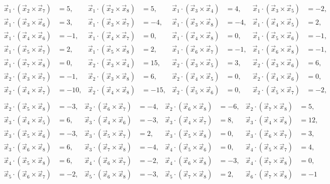 \documentclass[11pt]{exam}
\begin{document}
\begin{questions}
\begin{solution}
\begin{align*}
		\vec{x}_1\cdot(\vec{x}_2\times\vec{x}_7)&=5,&
		\vec{x}_1\cdot(\vec{x}_2\times\vec{x}_8)&=5,&
		\vec{x}_1\cdot(\vec{x}_3\times\vec{x}_4)&=4,&
		\vec{x}_1\cdot(\vec{x}_3\times\vec{x}_5)&=-2,\\
		\vec{x}_1\cdot(\vec{x}_3\times\vec{x}_6)&=3,&
		\vec{x}_1\cdot(\vec{x}_3\times\vec{x}_7)&=-4,&
		\vec{x}_1\cdot(\vec{x}_3\times\vec{x}_8)&=-4,&
		\vec{x}_1\cdot(\vec{x}_4\times\vec{x}_5)&=2,\\
		\vec{x}_1\cdot(\vec{x}_4\times\vec{x}_6)&=-1,&
		\vec{x}_1\cdot(\vec{x}_4\times\vec{x}_7)&=0,&
		\vec{x}_1\cdot(\vec{x}_4\times\vec{x}_8)&=0,&
		\vec{x}_1\cdot(\vec{x}_5\times\vec{x}_6)&=-1,\\
		\vec{x}_1\cdot(\vec{x}_5\times\vec{x}_7)&=2,&
		\vec{x}_1\cdot(\vec{x}_5\times\vec{x}_8)&=2,&
		\vec{x}_1\cdot(\vec{x}_6\times\vec{x}_7)&=-1,&
		\vec{x}_1\cdot(\vec{x}_6\times\vec{x}_8)&=-1,\\
		\vec{x}_1\cdot(\vec{x}_7\times\vec{x}_8)&=0,&
		\vec{x}_2\cdot(\vec{x}_3\times\vec{x}_4)&=15,&
		\vec{x}_2\cdot(\vec{x}_3\times\vec{x}_5)&=3,&
		\vec{x}_2\cdot(\vec{x}_3\times\vec{x}_6)&=6,\\
		\vec{x}_2\cdot(\vec{x}_3\times\vec{x}_7)&=-1,&
		\vec{x}_2\cdot(\vec{x}_3\times\vec{x}_8)&=6,&
		\vec{x}_2\cdot(\vec{x}_4\times\vec{x}_5)&=0,&
		\vec{x}_2\cdot(\vec{x}_4\times\vec{x}_6)&=0,\\
		\vec{x}_2\cdot(\vec{x}_4\times\vec{x}_7)&=-10,&
		\vec{x}_2\cdot(\vec{x}_4\times\vec{x}_8)&=-15,&
		\vec{x}_2\cdot(\vec{x}_5\times\vec{x}_6)&=0,&
		\vec{x}_2\cdot(\vec{x}_5\times\vec{x}_7)&=-2,\\
	\end{align*}\begin{align*}
		\vec{x}_2\cdot(\vec{x}_5\times\vec{x}_8)&=-3,&
		\vec{x}_2\cdot(\vec{x}_6\times\vec{x}_7)&=-4,&
		\vec{x}_2\cdot(\vec{x}_6\times\vec{x}_8)&=-6,&
		\vec{x}_2\cdot(\vec{x}_7\times\vec{x}_8)&=5,\\
		\vec{x}_3\cdot(\vec{x}_4\times\vec{x}_5)&=6,&
		\vec{x}_3\cdot(\vec{x}_4\times\vec{x}_6)&=-3,&
		\vec{x}_3\cdot(\vec{x}_4\times\vec{x}_7)&=8,&
		\vec{x}_3\cdot(\vec{x}_4\times\vec{x}_8)&=12,\\
		\vec{x}_3\cdot(\vec{x}_5\times\vec{x}_6)&=-3,&
		\vec{x}_3\cdot(\vec{x}_5\times\vec{x}_7)&=2,&
		\vec{x}_3\cdot(\vec{x}_5\times\vec{x}_8)&=0,&
		\vec{x}_3\cdot(\vec{x}_6\times\vec{x}_7)&=3,\\
		\vec{x}_3\cdot(\vec{x}_6\times\vec{x}_8)&=6,&
		\vec{x}_3\cdot(\vec{x}_7\times\vec{x}_8)&=-4,&
		\vec{x}_4\cdot(\vec{x}_5\times\vec{x}_6)&=0,&
		\vec{x}_4\cdot(\vec{x}_5\times\vec{x}_7)&=4,\\
		\vec{x}_4\cdot(\vec{x}_5\times\vec{x}_8)&=6,&
		\vec{x}_4\cdot(\vec{x}_6\times\vec{x}_7)&=-2,&
		\vec{x}_4\cdot(\vec{x}_6\times\vec{x}_8)&=-3,&
		\vec{x}_4\cdot(\vec{x}_7\times\vec{x}_8)&=0,\\
		\vec{x}_5\cdot(\vec{x}_6\times\vec{x}_7)&=-2,&
		\vec{x}_5\cdot(\vec{x}_6\times\vec{x}_8)&=-3,&
		\vec{x}_5\cdot(\vec{x}_7\times\vec{x}_8)&=2,&
		\vec{x}_6\cdot(\vec{x}_7\times\vec{x}_8)&=-1
	\end{align*}
\end{solution}





\end{questions}
\end{document}
